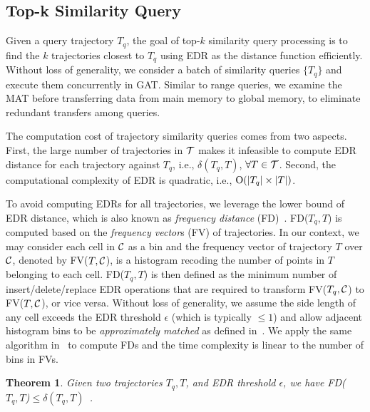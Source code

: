 \documentclass[10pt,conference,letterpaper]{IEEEtran}
\newcommand{\frname}{GAT\xspace }
\newcommand{\alltraj}{{{\cal T}}\xspace}
\newcommand{\edr}{{\delta}\xspace}
\newcommand{\allcell}{{\cal C}\xspace}
\newcommand{\bigoh}{{\rm O}\xspace}
\newtheorem{theorem}{Theorem}
\begin{document}

\subsection{Top-k Similarity Query}


Given a query trajectory $T_q$, the goal of top-$k$ similarity query processing is to find the $k$ trajectories closest to $T_q$ using EDR as the distance function efficiently.
Without loss of generality, we consider a batch of similarity queries $\{T_q\}$ and execute them concurrently in \frname.
Similar to range queries, we examine the MAT before transferring data from main memory to global memory, to eliminate redundant transfers among queries.


The computation cost of trajectory similarity queries comes from two aspects. First, the large number of trajectories in $\alltraj$ makes it infeasible to compute EDR distance for each trajectory against $T_q$, i.e., $\edr(T_q, T)$, $\forall T\in\alltraj$. Second, the computational complexity of EDR is quadratic, i.e., $\bigoh(|T_q|\times|T|)$.

To avoid computing EDRs for all trajectories, we leverage the lower bound of EDR distance, which is also known as \emph{frequency distance} (FD)~\cite{DBLP:conf/sigmod/ChenOO05}.
FD($T_q, T$) is computed based on the \emph{frequency vector}s (FV) of trajectories. In our context, we may consider each cell in $\allcell$ as a bin and the frequency vector of trajectory $T$ over $\allcell$, denoted by FV($T, \allcell$), is a histogram recoding the number of points in $T$ belonging to each cell.
FD($T_q, T$) is then defined as the minimum number of insert/delete/replace EDR operations that are required to transform FV($T_q, \allcell$) to FV($T,\allcell$), or vice versa. Without loss of generality, we assume the side length of any cell exceeds the EDR threshold $\epsilon$ (which is typically $\leq 1$) and allow adjacent histogram bins to be \emph{approximately matched} as defined in~\cite{DBLP:conf/sigmod/ChenOO05}.
We apply the same algorithm in~\cite{DBLP:conf/sigmod/ChenOO05} to compute FDs and the time complexity is linear to the number of bins in FVs.

\begin{theorem}\label{the:lb}
	Given two trajectories $T_q, T$, and EDR threshold $\epsilon$, we have FD($T_q, T$)$\leq \edr(T_q, T)$~\cite{DBLP:conf/sigmod/ChenOO05}.
\end{theorem}
\end{document}
